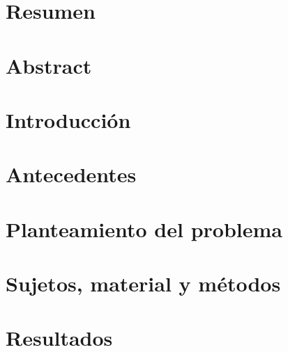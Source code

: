 \documentclass[12pt, letterpaper, oneside, openany]{book}
\begin{document}


\pagestyle{empty}
% 
% 
% 


\frontmatter
\pagestyle{plain}
\chapter*{\center Resumen}
% 

\chapter*{\center Abstract}

\tableofcontents

\mainmatter
{}
\newcommand{\hsp}{\hspace{15pt}}
\titleformat{\chapter}[hang]{\Huge\bfseries}{\thechapter\hsp\textcolor{gray42}{\textbar}\hsp}{0pt}{\Huge\bfseries}

\chapter{Introducción}


\chapter{Antecedentes}


\chapter{Planteamiento del problema}


\chapter{Sujetos, material y métodos}


\chapter{Resultados}


\backmatter
{}
\printbibliography
\end{document}
